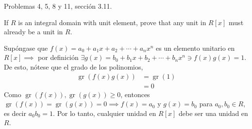 




Problemas 4, 5, 8 y 11, sección 3.11.


\begin{problema}[Problema 4]
    If $R$ is an integral domain with unit element, prove that any unit in $R[x]$ must already be a unit in $R$.
    \begin{dem}
        Supóngase que $f(x)=a_0+a_1x+a_2+\cdots + a_nx^n$ es un elemento unitario en $R[x]\implies$ por definición $\exists g(x)=b_0+b_1x+b_2+\cdots + b_nx^n\ni f(x)g(x)=1$. De esto, nótese que el grado de los polinomios,
        \begin{align*}
            \operatorname{gr}(f(x)g(x)) &= \operatorname{gr}(1)\\
            &= 0
        \end{align*}
        Como $\operatorname{gr}(f(x)),\operatorname{gr}(g(x))\geq 0$, entonces $\operatorname{gr}(f(x))=\operatorname{gr}(g(x))=0\implies f(x)=a_0$ y $g(x)=b_0$ para $a_0,b_0\in R$, es decir $a_0b_0=1$. Por lo tanto, cualquier unidad en $R[x]$ debe ser una unidad en $R$. 
    \end{dem}  
\end{problema}

